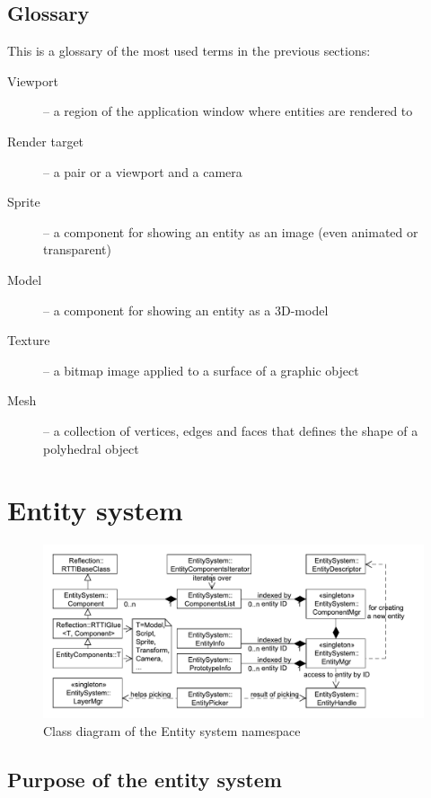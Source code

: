 \documentclass[a4paper, 12pt]{report}
\begin{document}
\section{Glossary}
This is a glossary of the most used terms in the previous sections:

\begin{description}
  \item[Viewport] -- a region of the application window where entities are rendered to
  \item[Render target] -- a pair or a viewport and a camera
  \item[Sprite] -- a component for showing an entity as an image (even animated or transparent)
  \item[Model] -- a component for showing an entity as a 3D-model
  \item[Texture] -- a bitmap image applied to a surface of a graphic object
  \item[Mesh] -- a collection of vertices, edges and faces that defines the shape of a polyhedral object
\end{description}



\chapter{Entity system}

\begin{figure}[htbp]
	\centering
		\includegraphics[width=1\textwidth]{EntitySystemClassDiagram.pdf}
	\caption{Class diagram of the Entity system namespace}
	\label{fig:entitysystem-diagram}
\end{figure}

\section{Purpose of the entity system}
\end{document}

